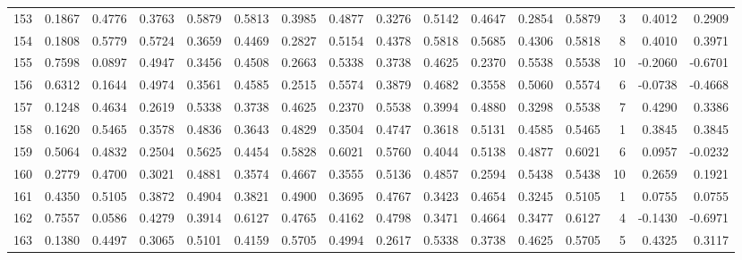 \begin{tabular}{lrrrrrrrrrrrrrrr}
153 &      0.1867 &  0.4776 &  0.3763 &  0.5879 &  0.5813 &  0.3985 &  0.4877 &  0.3276 &  0.5142 &  0.4647 &   0.2854 &     0.5879 &      3 &                    0.4012 &                     0.2909 \\
154 &      0.1808 &  0.5779 &  0.5724 &  0.3659 &  0.4469 &  0.2827 &  0.5154 &  0.4378 &  0.5818 &  0.5685 &   0.4306 &     0.5818 &      8 &                    0.4010 &                     0.3971 \\
155 &      0.7598 &  0.0897 &  0.4947 &  0.3456 &  0.4508 &  0.2663 &  0.5338 &  0.3738 &  0.4625 &  0.2370 &   0.5538 &     0.5538 &     10 &                   -0.2060 &                    -0.6701 \\
156 &      0.6312 &  0.1644 &  0.4974 &  0.3561 &  0.4585 &  0.2515 &  0.5574 &  0.3879 &  0.4682 &  0.3558 &   0.5060 &     0.5574 &      6 &                   -0.0738 &                    -0.4668 \\
157 &      0.1248 &  0.4634 &  0.2619 &  0.5338 &  0.3738 &  0.4625 &  0.2370 &  0.5538 &  0.3994 &  0.4880 &   0.3298 &     0.5538 &      7 &                    0.4290 &                     0.3386 \\
158 &      0.1620 &  0.5465 &  0.3578 &  0.4836 &  0.3643 &  0.4829 &  0.3504 &  0.4747 &  0.3618 &  0.5131 &   0.4585 &     0.5465 &      1 &                    0.3845 &                     0.3845 \\
159 &      0.5064 &  0.4832 &  0.2504 &  0.5625 &  0.4454 &  0.5828 &  0.6021 &  0.5760 &  0.4044 &  0.5138 &   0.4877 &     0.6021 &      6 &                    0.0957 &                    -0.0232 \\
160 &      0.2779 &  0.4700 &  0.3021 &  0.4881 &  0.3574 &  0.4667 &  0.3555 &  0.5136 &  0.4857 &  0.2594 &   0.5438 &     0.5438 &     10 &                    0.2659 &                     0.1921 \\
161 &      0.4350 &  0.5105 &  0.3872 &  0.4904 &  0.3821 &  0.4900 &  0.3695 &  0.4767 &  0.3423 &  0.4654 &   0.3245 &     0.5105 &      1 &                    0.0755 &                     0.0755 \\
162 &      0.7557 &  0.0586 &  0.4279 &  0.3914 &  0.6127 &  0.4765 &  0.4162 &  0.4798 &  0.3471 &  0.4664 &   0.3477 &     0.6127 &      4 &                   -0.1430 &                    -0.6971 \\
163 &      0.1380 &  0.4497 &  0.3065 &  0.5101 &  0.4159 &  0.5705 &  0.4994 &  0.2617 &  0.5338 &  0.3738 &   0.4625 &     0.5705 &      5 &                    0.4325 &                     0.3117 \\

\end{tabular}
